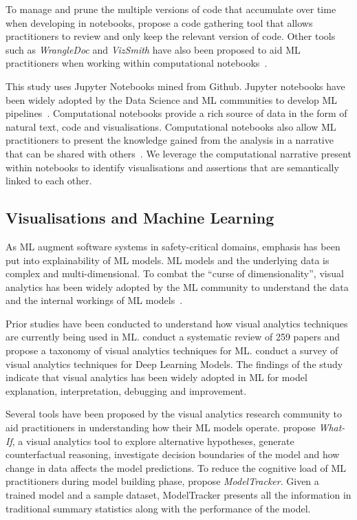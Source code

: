 \documentclass[conference]{IEEEtran}
\begin{document}
To manage and prune the multiple versions of code that accumulate over time when developing in notebooks, \cite{head2019managing} propose a code gathering tool that allows practitioners to review and only keep the relevant version of code. Other tools such as \textit{WrangleDoc} and \textit{VizSmith} have also been proposed to aid ML practitioners when working within computational notebooks~\cite{yang2021subtle, bavishi2021vizsmith}.

This study uses Jupyter Notebooks mined from Github. Jupyter notebooks have been widely adopted by the Data Science and ML communities to develop ML pipelines~\cite{wang2020assessing,pimentel2019large,quaranta2021kgtorrent}. Computational notebooks provide a rich source of data in the form of natural text, code and visualisations. Computational notebooks also allow ML practitioners to present the knowledge gained from the analysis in a narrative that can be shared with others~\cite{rule2018exploration}. We leverage the computational narrative present within notebooks to identify visualisations and assertions that are semantically linked to each other.

\subsection{Visualisations and Machine Learning}\label{sec:visualisations}

As ML augment software systems in safety-critical domains, emphasis has been put into explainability of ML models. ML models and the underlying data is complex and multi-dimensional. To combat the ``curse of dimensionality'', visual analytics has been widely adopted by the ML community to understand the data and the internal workings of ML models~\cite{yuan2021survey,hohman2019visual,wexler2020if}.

Prior studies have been conducted to understand how visual analytics techniques are currently being used in ML. \cite{yuan2021survey} conduct a systematic review of 259 papers and propose a taxonomy of visual analytics techniques for ML. \cite{hohman2019visual} conduct a survey of visual analytics techniques for Deep Learning Models. The findings of the study indicate that visual analytics has been widely adopted in ML for model explanation, interpretation, debugging and improvement.

Several tools have been proposed by the visual analytics research community to aid practitioners in understanding how their ML models operate. \cite{wexler2020if} propose \textit{What-If}, a visual analytics tool to explore alternative hypotheses, generate counterfactual reasoning, investigate decision boundaries of the model and how change in data affects the model predictions. To reduce the cognitive load of ML practitioners during model building phase, \cite{amershi2015modeltracker} propose \textit{ModelTracker}. Given a trained model and a sample dataset, ModelTracker presents all the information in traditional summary statistics along with the performance of the model.
\end{document}
